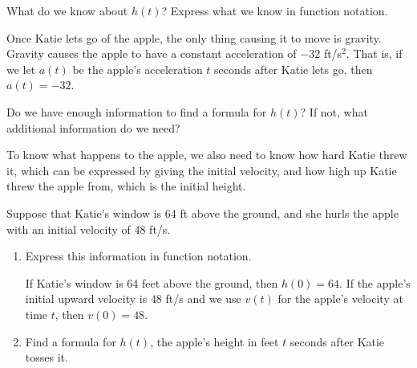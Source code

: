 \documentclass{article}
\begin{document}
\begin{enumerate}
\begin{enumerate}
    \begin{problem}[\stretch{0.375}]
      What do we know about $h(t)$? Express what we know in function notation. 
    \end{problem}    

    \begin{solution}
      Once Katie lets go of the apple, the only thing causing it to move is gravity. Gravity causes the apple to have a constant acceleration of $-32$ ft/s$^2$. That is, if we let $a(t)$ be the apple's acceleration $t$ seconds after Katie lets go, then $a(t) = -32$.
    \end{solution}


    \begin{problem}[\nstretch{0.375}]
      Do we have enough information to find a formula for $h(t)$? If not, what additional information do we need?
    \end{problem}

    \begin{solution}      
      To know what happens to the apple, we also need to know how hard Katie threw it, which can be expressed by giving the initial velocity, and how high up Katie threw the apple from, which is the initial height.      
    \end{solution}

  \end{enumerate}

  Suppose that Katie's window is 64 ft above the ground, and she hurls the apple with an initial velocity of 48 ft/s.

  \begin{enumerate}[resume]
  \item
    \begin{problem}[0.25in]
      Express this information in function notation. 
    \end{problem}

    \begin{solution}
      If Katie's window is 64 feet above the ground, then $h(0)=64$.
      If the apple's initial upward velocity is $48$ ft/s and
      we use $v(t)$ for the apple's velocity at time $t$, then $v(0)=48$.
    \end{solution}

  \item \label{gravity-apple-height}
    \begin{problem}[\vfill]
      Find a formula for $h(t)$, the apple's height in feet $t$ seconds after Katie tosses it.
    \end{problem}


\end{enumerate}
\end{enumerate}
\end{document}
